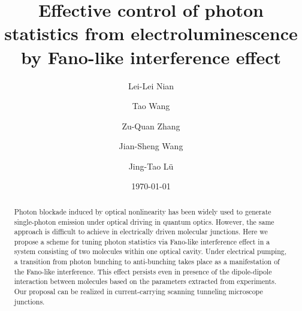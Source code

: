 \documentclass[aps,prb,
superscriptaddress,
,twocolumn
,floatfix,footinbib,longbibliography,
]{revtex4-2}
\begin{document}

\title{Effective control of photon statistics from electroluminescence by Fano-like interference effect}

\author{Lei-Lei Nian}
\author{Tao Wang}
\author{Zu-Quan Zhang}
\author{Jian-Sheng Wang}
\author{Jing-Tao L\"{u}}




\date{\today}%
\begin{abstract}
Photon blockade induced by optical nonlinearity has been widely used to generate single-photon emission under optical driving in quantum optics. However, the same approach is difficult to achieve in electrically driven molecular junctions. Here we propose a scheme for tuning photon statistics via Fano-like interference effect in a system consisting of two molecules within one optical cavity.
Under electrical pumping, a transition from photon bunching to anti-bunching takes place as a manifestation of the Fano-like interference. This effect persists even in presence of the dipole-dipole interaction between molecules based on the parameters extracted from experiments.
Our proposal can be realized in current-carrying scanning tunneling microscope junctions.


\end{abstract}

\maketitle
\end{document}
